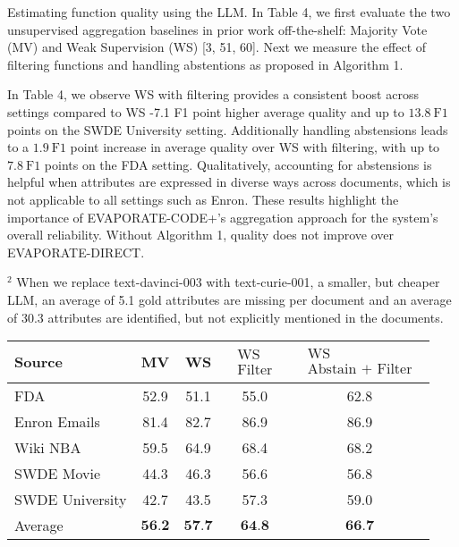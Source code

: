 \documentclass[10pt]{article}
\begin{document}
Estimating function quality using the LLM. In Table 4, we first evaluate the two unsupervised aggregation baselines in prior work off-the-shelf: Majority Vote (MV) and Weak Supervision (WS) [3, 51, 60]. Next we measure the effect of filtering functions and handling abstentions as proposed in Algorithm 1.

In Table 4, we observe WS with filtering provides a consistent boost across settings compared to WS -7.1 F1 point higher average quality and up to $13.8 \mathrm{~F} 1$ points on the SWDE University setting. Additionally handling abstensions leads to a $1.9 \mathrm{~F} 1$ point increase in average quality over WS with filtering, with up to $7.8 \mathrm{~F} 1$ points on the FDA setting. Qualitatively, accounting for abstensions is helpful when attributes are expressed in diverse ways across documents, which is not applicable to all settings such as Enron. These results highlight the importance of EVAPORATE-CODE+'s aggregation approach for the system's overall reliability. Without Algorithm 1, quality does not improve over EVAPORATE-DIRECT.

${ }^{2}$ When we replace text-davinci-003 with text-curie-001, a smaller, but cheaper LLM, an average of 5.1 gold attributes are missing per document and an average of 30.3 attributes are identified, but not explicitly mentioned in the documents.

\begin{center}
\begin{tabular}{lcc|cc}
\hline
Source & MV & WS & $\begin{array}{c}\text { WS } \\ \text { Filter }\end{array}$ & $\begin{array}{c}\text { WS } \\ \text { Abstain + Filter }\end{array}$ \\
\hline
FDA & 52.9 & 51.1 & 55.0 & 62.8 \\
Enron Emails & 81.4 & 82.7 & 86.9 & 86.9 \\
Wiki NBA & 59.5 & 64.9 & 68.4 & 68.2 \\
SWDE Movie & 44.3 & 46.3 & 56.6 & 56.8 \\
SWDE University & 42.7 & 43.5 & 57.3 & 59.0 \\
\hline
Average & $\mathbf{5 6 . 2}$ & $\mathbf{5 7 . 7}$ & $\mathbf{6 4 . 8}$ & $\mathbf{6 6 . 7}$ \\
\hline
\end{tabular}
\end{center}
\end{document}
